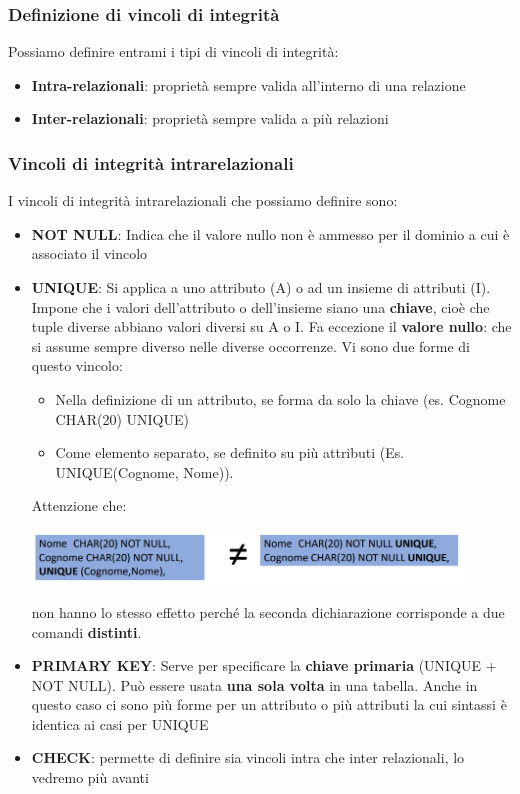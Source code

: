 \documentclass[12pt]{article}
\begin{document}
\subsubsection{Definizione di vincoli di integrità}
Possiamo definire entrami i tipi di vincoli di integrità:
\begin{itemize}
    \item \textbf{Intra-relazionali}: proprietà sempre valida all'interno di una relazione
    \item \textbf{Inter-relazionali}: proprietà sempre valida a più relazioni
\end{itemize}
\subsubsection{Vincoli di integrità intrarelazionali}
I vincoli di integrità intrarelazionali che possiamo definire sono:
\begin{itemize}
    \item \textbf{NOT NULL}: Indica che il valore nullo non è ammesso per il dominio a cui è associato il vincolo
    \item \textbf{UNIQUE}: Si applica a uno attributo (A) o ad un insieme di attributi (I). Impone che i valori dell'attributo o dell'insieme siano una \textbf{chiave}, cioè che tuple diverse abbiano valori diversi su A o I.
    Fa eccezione il \textbf{valore nullo}: che si assume sempre diverso nelle diverse occorrenze. Vi sono due forme di questo vincolo:
    \begin{itemize}
        \item Nella definizione di un attributo, se forma da solo la chiave (es. Cognome CHAR(20) UNIQUE)
        \item Come elemento separato, se definito su più attributi (Es. UNIQUE(Cognome, Nome)).
    \end{itemize} 
    Attenzione che:
    \begin{center}
        \includegraphics[width = 0.90\textwidth]{Images/181.PNG}
    \end{center}
    non hanno lo stesso effetto perché la seconda dichiarazione corrisponde a due comandi \textbf{distinti}.
    \item \textbf{PRIMARY KEY}: Serve per specificare la \textbf{chiave primaria} (UNIQUE + NOT NULL). Può essere usata \textbf{una sola volta} in una tabella.
    Anche in questo caso ci sono più forme per un attributo o più attributi la cui sintassi è identica ai casi per UNIQUE
    \item \textbf{CHECK}: permette di definire sia vincoli intra che inter relazionali, lo vedremo più avanti
\end{itemize}
\end{document}
